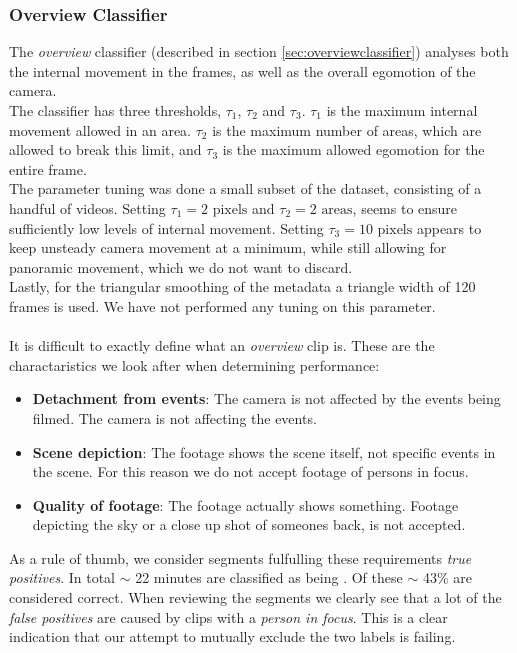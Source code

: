 \subsubsection{Overview Classifier}\label{sec:peformanceforoverviewclassifier}
%
The \textit{overview} classifier (described in section \ref{sec:overviewclassifier}) analyses both the internal movement in the frames, as well as the overall egomotion of the camera.\\
The classifier has three thresholds, $\tau_{1}$, $\tau_{2}$ and $\tau_{3}$. $\tau_{1}$ is the maximum internal movement allowed in an area. $\tau_{2}$ is the maximum number of areas, which are allowed to break this limit, and $\tau_{3}$ is the maximum allowed egomotion for the entire frame.\\
The parameter tuning was done a small subset of the dataset, consisting of a handful of videos. Setting $\tau_{1} = 2 \text{ pixels}$ and $\tau_{2} = 2 \text{ areas}$, seems to ensure sufficiently low levels of internal movement. Setting $\tau_{3} = 10 \text{ pixels}$ appears to keep unsteady camera movement at a minimum, while still allowing for panoramic movement, which we do not want to discard.\\
Lastly, for the triangular smoothing of the metadata a triangle width of 120 frames is used. We have not performed any tuning on this parameter.\\
\\
It is difficult to exactly define what an \textit{overview} clip is. These are the charactaristics we look after when determining performance:
%
\begin{itemize}
	\item \textbf{Detachment from events}: The camera is not affected by the events being filmed. The camera is not affecting the events.
	\item \textbf{Scene depiction}: The footage shows the scene itself, not specific events in the scene. For this reason we do not accept footage of persons in focus.
	\item \textbf{Quality of footage}: The footage actually shows something. Footage depicting the sky or a close up shot of someones back, is not accepted.
\end{itemize}
%
As a rule of thumb, we consider segments fulfulling these requirements \textit{true positives}. In total $\sim$ 22 minutes are classified as being . Of these $\sim$ 43\% are considered correct. When reviewing the segments we clearly see that a lot of the \textit{false positives} are caused by clips with a \textit{person in focus}. This is a clear indication that our attempt to mutually exclude the two labels is failing.
%

